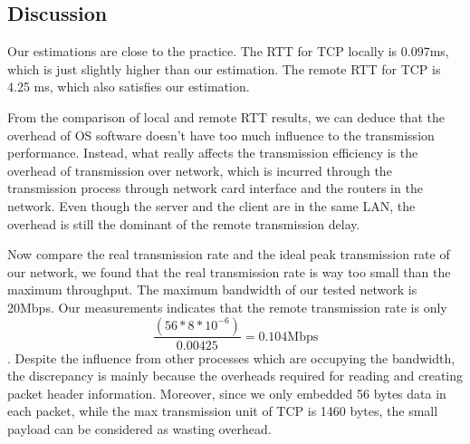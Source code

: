 \subsection{Discussion}

Our estimations are close to the practice. The RTT for TCP locally is 0.097ms, which is just slightly higher than our estimation. The remote RTT for TCP is 4.25 ms, which also satisfies our estimation. 

From the comparison of local and remote RTT results, we can deduce that the overhead of OS software doesn't have too much influence to the transmission performance. Instead, what really affects the transmission efficiency is the overhead of transmission over network, which is incurred through the transmission process through network card interface and the routers in the network. Even though the server and the client are in the same LAN, the overhead is still the dominant of the remote transmission delay. 

Now compare the real transmission rate and the ideal peak transmission rate of our network, we found that the real transmission rate is way too small than the maximum throughput. The maximum bandwidth of our tested network is 20Mbps. Our measurements indicates that the remote transmission rate is only $$\frac{(56*8*10^{-6})}{0.00425} = 0.104\text{Mbps}$$. Despite the influence from other processes which are occupying the bandwidth, the discrepancy is mainly because the overheads required for reading and creating packet header information. Moreover, since we only embedded 56 bytes data in each packet, while the max transmission unit of TCP is 1460 bytes, the small payload can be considered as wasting overhead. 
